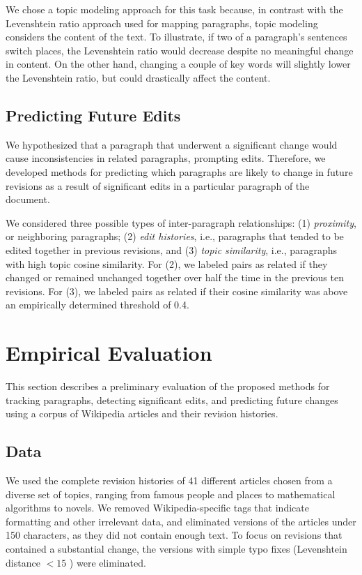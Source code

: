 We chose a topic modeling approach for this task because, in contrast
with the Levenshtein ratio approach used for mapping paragraphs, topic
modeling considers the content of the text. To illustrate, if two of a
paragraph's sentences switch places, the Levenshtein ratio would
decrease despite no meaningful change in content. On the other hand,
changing a couple of key words will slightly lower the Levenshtein
ratio, but could drastically affect the content.

\subsection{Predicting Future Edits}\label{predicting-future-edits}

We hypothesized that a paragraph that underwent a significant change
would cause inconsistencies in related paragraphs, prompting edits.
Therefore, we developed methods for predicting which paragraphs are
likely to change in future revisions as a result of significant edits in
a particular paragraph of the document.

We considered three possible types of inter-paragraph relationships: (1)
\emph{proximity}, or neighboring paragraphs; (2) \emph{edit histories},
i.e., paragraphs that tended to be edited together in previous
revisions, and (3) \emph{topic similarity}, i.e., paragraphs with high
topic cosine similarity. For (2), we labeled pairs as related if they
changed or remained unchanged together over half the time in the
previous ten revisions. For (3), we labeled pairs as related if their
cosine similarity was above an empirically determined threshold of 0.4.

\section{Empirical Evaluation}\label{empirical-evaluation}

This section describes a preliminary evaluation of the proposed methods
for tracking paragraphs, detecting significant edits, and predicting
future changes using a corpus of Wikipedia articles and their revision
histories.

\subsection{Data}\label{data}

We used the complete revision histories of 41 different articles chosen
from a diverse set of topics, ranging from famous people and places to
mathematical algorithms to novels. We removed Wikipedia-specific tags
that indicate formatting and other irrelevant data, and eliminated
versions of the articles under 150 characters, as they did not contain
enough text. To focus on revisions that contained a substantial change,
the versions with simple typo fixes (Levenshtein distance \(< 15\) )
were eliminated.

